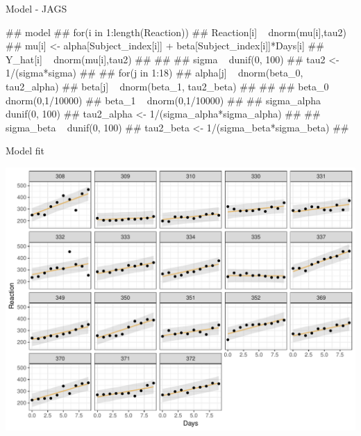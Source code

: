 \documentclass[11pt,ignorenonframetext,]{beamer}
\let\oldverbatim\verbatim
\let\endoldverbatim\endverbatim
\renewenvironment{verbatim}{\footnotesize\begin{spacing}{0.9}\oldverbatim}{\endoldverbatim\end{spacing}}
\begin{document}
\begin{frame}[fragile]{Model - JAGS}

\vspace{-2mm}

\begin{verbatim}
## model{
##   for(i in 1:length(Reaction)) {
##     Reaction[i] ~ dnorm(mu[i],tau2)
##     mu[i] <- alpha[Subject_index[i]] + beta[Subject_index[i]]*Days[i]
##     Y_hat[i] ~ dnorm(mu[i],tau2)
##   }
## 
##   sigma ~ dunif(0, 100) 
##   tau2 <- 1/(sigma*sigma)
## 
##   for(j in 1:18) {
##     alpha[j] ~ dnorm(beta_0, tau2_alpha)
##     beta[j]  ~ dnorm(beta_1, tau2_beta)
##   }
## 
##   beta_0 ~ dnorm(0,1/10000)
##   beta_1 ~ dnorm(0,1/10000)  
## 
##   sigma_alpha ~ dunif(0, 100) 
##   tau2_alpha <- 1/(sigma_alpha*sigma_alpha)
## 
##   sigma_beta ~ dunif(0, 100) 
##   tau2_beta <- 1/(sigma_beta*sigma_beta)
## }
\end{verbatim}

\end{frame}

\begin{frame}{Model fit}

\includegraphics{Lec5_files/figure-beamer/unnamed-chunk-34-1.pdf}

\end{frame}
\end{document}
